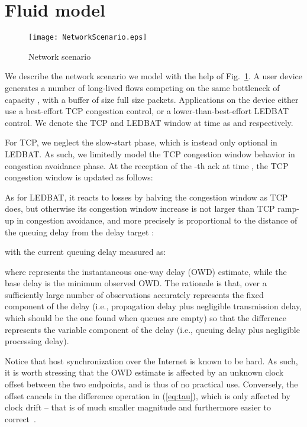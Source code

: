 \documentclass[conference]{IEEEtran}
\newcommand{\secL}[1]{\label{sec:#1}}
\newcommand{\eqR}[1]{(\ref{eq:#1})}
\newcommand{\figR}[1]{Fig.~\ref{fig:#1}}
\newcommand{\figLC}[2]{
		\caption{#2}
		\label{fig:#1}
}
\begin{document}
\section{Fluid model}\secL{model}

\begin{figure}[t]
    \begin{center}
        \texttt{[image: NetworkScenario.eps]}
        \figLC{scenario}{Network scenario}
    \end{center}
\end{figure}





We describe the network scenario we model with the help of \figR{scenario}. 
A user device generates a number of long-lived flows competing on the same bottleneck of capacity , with a buffer of size  full size packets. Applications on the device either use a best-effort TCP congestion control, or a lower-than-best-effort LEDBAT control. We denote the TCP and LEDBAT window at time  as  and  respectively.  

For TCP, we neglect the slow-start phase, which is instead only optional in LEDBAT. As such, we limitedly model the TCP congestion window behavior in congestion avoidance phase. At the reception of the -th ack at time , the TCP congestion window is updated as follows:

\noindent As for LEDBAT, it reacts to losses by halving the congestion window as TCP does, but otherwise its congestion window increase is not larger than TCP ramp-up in congestion avoidance, and more precisely is proportional to the distance of the queuing delay  from the delay target :

\noindent with the current queuing delay  measured as:

\noindent where  represents the instantaneous one-way delay (OWD) estimate, while the base delay  is the minimum observed OWD. The rationale is that, over a sufficiently large number of observations  accurately represents the fixed component of the delay (i.e., propagation delay plus negligible transmission delay, which should be the one found when queues are empty) so that the   difference represents the variable component of the delay (i.e., queuing delay plus negligible processing delay). 

Notice that host synchronization over the Internet is known to be hard. As such, it is worth stressing that the OWD estimate  is affected by an unknown clock offset between the two endpoints, and is thus of no practical use. Conversely, the offset cancels in the difference operation in \eqR{tau}, which is only affected by clock drift -- that is of much smaller magnitude and furthermore easier to correct~\cite{cohen10iptps}.
\end{document}
